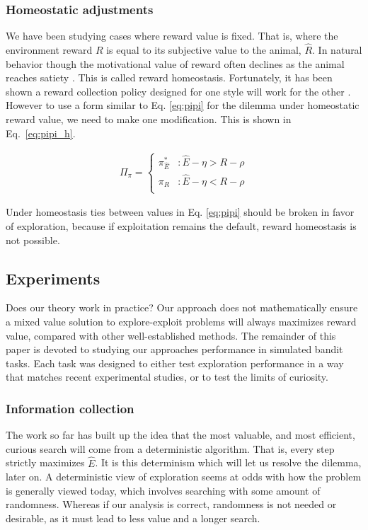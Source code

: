 \subsubsection*{Homeostatic adjustments}
We have been studying cases where reward value is fixed. That is, where the environment reward $R$ is equal to its subjective value to the animal, $\hat R$. In natural behavior though the motivational value of reward often declines as the animal reaches satiety \cite{Keramati2014,Juechems2019,Munch2020}. This is called reward homeostasis. Fortunately, it has been shown a reward collection policy designed for one style will work for the other \cite{Keramati2014}. However to use a form similar to Eq. \ref{eq:pipi} for the dilemma under homeostatic reward value, we need to make one modification. This is shown in Eq.~\ref{eq:pipi_h}. 

\begin{equation} 
    \label{eq:pipi_h}
    \begin{split}
        \Pi_{\pi} = 
        \begin{cases}
            \pi^*_{\hat{E}} & : \hat{E} - \eta > R - \rho \\
            \pi_R 	& : \hat{E} - \eta < R - \rho \\
        \end{cases}
    \end{split}
\end{equation}

Under homeostasis ties between values in Eq. \ref{eq:pipi} should be broken in favor of exploration, because if exploitation remains the default, reward homeostasis is not possible. 

\subsection*{Experiments}
Does our theory work in practice? Our approach does not mathematically ensure a mixed value solution to explore-exploit problems will always maximizes reward value, compared with other well-established methods. The remainder of this paper is devoted to studying our approaches performance in simulated bandit tasks. Each task was designed to either test exploration performance in a way that matches recent experimental studies, or to test the limits of curiosity. 

\subsubsection*{Information collection}
The work so far has built up the idea that the most valuable, and most efficient, curious search will come from a deterministic algorithm. That is, every step strictly maximizes $\hat E$. It is this determinism which will let us resolve the dilemma, later on. A deterministic view of exploration seems at odds with how the problem is generally viewed today, which involves searching with some amount of randomness. Whereas if our analysis is correct, randomness is not needed or desirable, as it must lead to less value and a longer search. 


